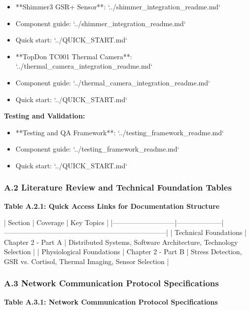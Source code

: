 \documentclass[11pt,a4paper]{article}
\begin{document}
\begin{itemize}
\item **Shimmer3 GSR+ Sensor**: `../shimmer_integration_readme.md`
\item Component guide: `../shimmer_integration_readme.md`
\item Quick start: `../QUICK_START.md`

\item **TopDon TC001 Thermal Camera**: `../thermal_camera_integration_readme.md`
\item Component guide: `../thermal_camera_integration_readme.md`
\item Quick start: `../QUICK_START.md`

\end{itemize}
\textbf{Testing and Validation:}

\begin{itemize}
\item **Testing and QA Framework**: `../testing_framework_readme.md`
\item Component guide: `../testing_framework_readme.md`
\item Quick start: `../QUICK_START.md`

\end{itemize}
\subsubsection{A.2 Literature Review and Technical Foundation Tables}

\textbf{Table A.2.1: Quick Access Links for Documentation Structure}

| Section                   | Coverage           | Key Topics                                                            |
|---------------------------|--------------------|-----------------------------------------------------------------------|
| Technical Foundations     | Chapter 2 - Part A | Distributed Systems, Software Architecture, Technology Selection      |
| Physiological Foundations | Chapter 2 - Part B | Stress Detection, GSR vs. Cortisol, Thermal Imaging, Sensor Selection |

\subsubsection{A.3 Network Communication Protocol Specifications}

\textbf{Table A.3.1: Network Communication Protocol Specifications}
\end{document}
